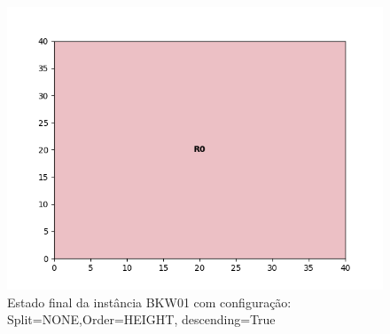 \begin{figure}[H]
    \centering
    \caption[]{Estado final da instância BKW01 com configuração: Split=NONE,Order=HEIGHT, descending=True}
    \label{fig:bkw01-none-height-true}
    \includegraphics[scale=0.5]{output/figures/bkw/bkw01/none/height/true/00}
\end{figure}